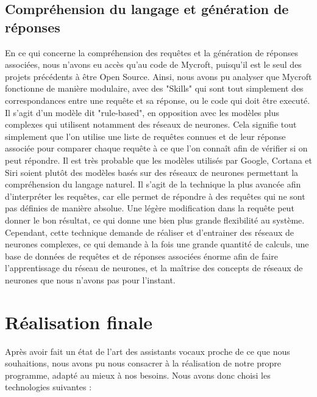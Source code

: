 \documentclass[a4paper,10pt]{report}
\begin{document}
    \section{Compréhension du langage et génération de réponses}
    {En ce qui concerne la compréhension des requêtes et la génération de réponses associées, nous n'avons eu accès qu'au code de Mycroft, puisqu'il est le seul des projets précédents à être Open Source. Ainsi, nous avons pu analyser que Mycroft fonctionne de manière modulaire, avec des "Skills" qui sont tout simplement des correspondances entre une requête et sa réponse, ou le code qui doit être executé. Il s'agit d'un modèle dit "rule-based", en opposition avec les modèles plus complexes qui utilisent notamment des réseaux de neurones. Cela signifie tout simplement que l'on utilise une liste de requêtes connues et de leur réponse associée pour comparer chaque requête à ce que l'on connaît afin de vérifier si on peut répondre.}
    {\newline Il est très probable que les modèles utilisés par Google, Cortana et Siri soient plutôt des modèles basés sur des réseaux de neurones permettant la compréhension du langage naturel. Il s'agit de la technique la plus avancée afin d'interpréter les requêtes, car elle permet de répondre à des requêtes qui ne sont pas définies de manière absolue. Une légère modification dans la requête peut donner le bon résultat, ce qui donne une bien plus grande flexibilité au système. Cependant, cette technique demande de réaliser et d'entrainer des réseaux de neurones complexes, ce qui demande à la fois une grande quantité de calculs, une base de données de requêtes et de réponses associées énorme afin de faire l'apprentissage du réseau de neurones, et la maîtrise des concepts de réseaux de neurones que nous n'avons pas pour l'instant.}

    \chapter{Réalisation finale}
    \label{sec:realisation}
    {Après avoir fait un état de l'art des assistants vocaux proche de ce que nous souhaitions, nous avons pu nous consacrer à la réalisation de notre propre programme, adapté au mieux à nos besoins. Nous avons donc choisi les technologies suivantes :}
\end{document}

